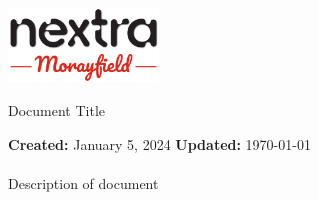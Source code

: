 \documentclass[a4paper, 12pt]{article}
\let\Huge\headingfont
\begin{document}
\begin{titlepage}
	\begin{minipage}[t]{1\columnwidth}
		\begin{flushright}
       	\vspace{-0.6in}
       	\includegraphics[width=0.3\textwidth]{MonextraNew.png}
			\vspace{0.5in}
		\par\end{flushright}
	\end{minipage}

	\begin{center}
		{\Huge Document Title}
	\end{center}
	\vspace{2em}
	\noindent
	\textbf{Created:} January 5, 2024
	\hfill
	\textbf{Updated:} \today
	\\\\\indent
	Description of document
	
	\tableofcontents
\end{titlepage}
\end{document}
